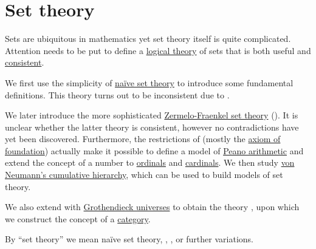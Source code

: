 \section{Set theory}\label{sec:set_theory}

Sets are ubiquitous in mathematics yet set theory itself is quite complicated. Attention needs to be put to define a \hyperref[def:first_order_theory]{logical theory} of sets that is both useful and \hyperref[def:first_order_theory_consistency]{consistent}.

We first use the simplicity of \hyperref[def:naive_set_theory]{na\"ive set theory} to introduce some fundamental definitions. This theory turns out to be inconsistent due to .

We later introduce the more sophisticated \hyperref[def:zfc]{Zermelo-Fraenkel set theory} (). It is unclear whether the latter theory is consistent, however no contradictions have yet been discovered. Furthermore, the restrictions of  (mostly the \hyperref[def:zfc/foundation]{axiom of foundation}) actually make it possible to define a model of \hyperref[def:peano_arithmetic]{Peano arithmetic} and extend the concept of a number to \hyperref[def:ordinal]{ordinals} and \hyperref[def:cardinals]{cardinals}. We then study \hyperref[def:cumulative_hierarchy]{von Neumann's cumulative hierarchy}, which can be used to build models of set theory.

We also extend  with \hyperref[def:grothendieck_universe]{Grothendieck universes} to obtain the theory \hyperref[def:axiom_of_universes]{}, upon which we construct the concept of a \hyperref[def:category]{category}.

By \enquote{set theory} we mean na\"ive set theory, , ,  or further variations.

